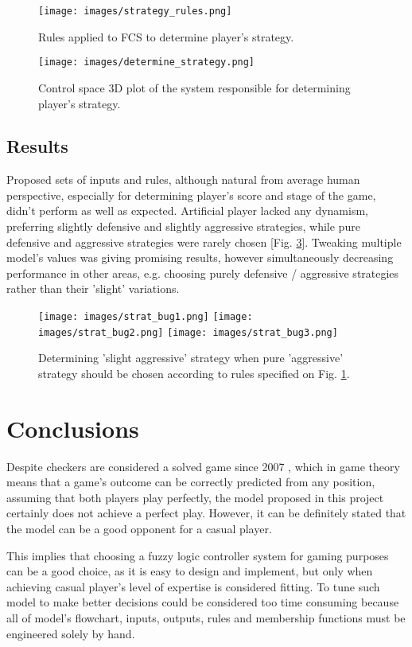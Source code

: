 \documentclass{article}
\begin{document}
\begin{figure}[tbhp]
  \centering
      \texttt{[image: images/strategy\_rules.png]}
  \caption{Rules applied to FCS to determine player's strategy.}
  \label{fig:strategy_rules}
\end{figure}

\begin{figure}[tbhp]
  \centering
      \texttt{[image: images/determine\_strategy.png]}
  \caption{Control space 3D plot of the system responsible for determining player's strategy.}
  \label{fig:strategy}
\end{figure}

\subsection{Results}

Proposed sets of inputs and rules, although natural from average human perspective, especially for determining player's score and stage of the game, didn't perform as well as expected. Artificial player lacked any dynamism, preferring slightly defensive and slightly aggressive strategies, while pure defensive and aggressive strategies were rarely chosen [Fig. \ref{fig:bugs}]. Tweaking multiple model's values was giving promising results, however simultaneously decreasing performance in other areas, e.g. choosing purely defensive / aggressive strategies rather than their 'slight' variations. 

\begin{figure}[tbhp]
  \centering
      \texttt{[image: images/strat\_bug1.png]}
      \texttt{[image: images/strat\_bug2.png]}
      \texttt{[image: images/strat\_bug3.png]}
  \caption{Determining 'slight aggressive' strategy when pure 'aggressive' strategy should be chosen according to rules specified on Fig. \ref{fig:strategy_rules}.}
  \label{fig:bugs}
\end{figure}

\section{Conclusions}

Despite checkers are considered a solved game since 2007 \cite{Schaeffer1518}, which in game theory means that a game's outcome can be correctly predicted from any position, assuming that both players play perfectly, the model proposed in this project certainly does not achieve a perfect play. However, it can be definitely stated that the model can be a good opponent for a casual player.

This implies that choosing a fuzzy logic controller system for gaming purposes can be a good choice, as it is easy to design and implement, but only when achieving casual player's level of expertise is considered fitting. To tune such model to make better decisions could be considered too time consuming because all of model's flowchart, inputs, outputs, rules and membership functions must be engineered solely by hand.

  

\end{document}
